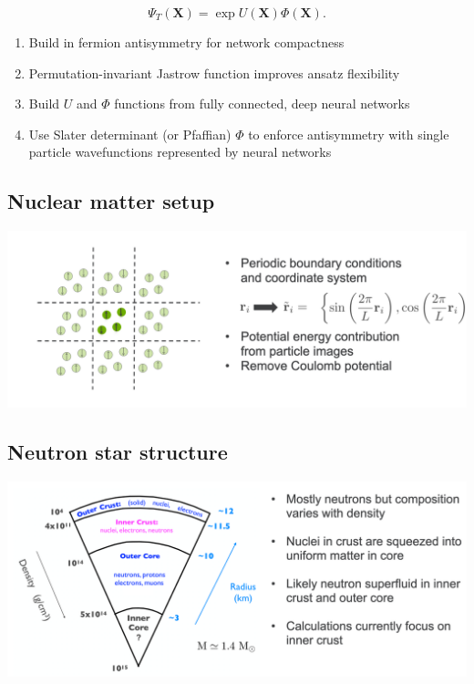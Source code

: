 \documentclass[%
oneside,                 %
final,                   %
10pt]{article}
\begin{document}
\[
\Psi_T(\bm{X}) =\exp{U(\bm{X})}\Phi(\bm{X}).
\]

\begin{block}{}
\begin{enumerate}
\item Build in fermion antisymmetry for network compactness

\item Permutation-invariant Jastrow function improves ansatz flexibility

\item Build $U$ and $\Phi$ functions from fully connected, deep neural networks

\item Use Slater determinant (or Pfaffian) $\Phi$ to enforce antisymmetry with single particle wavefunctions represented by neural networks
\end{enumerate}

\noindent
\end{block}

\subsection{Nuclear matter setup}

\vspace{6mm}

\centerline{\includegraphics[width=1.0\linewidth]{figures/mbpfig4.png}}

\vspace{6mm}

\subsection{Neutron star structure}

\vspace{6mm}

\centerline{\includegraphics[width=1.0\linewidth]{figures/mbpfig5.png}}
\end{document}
